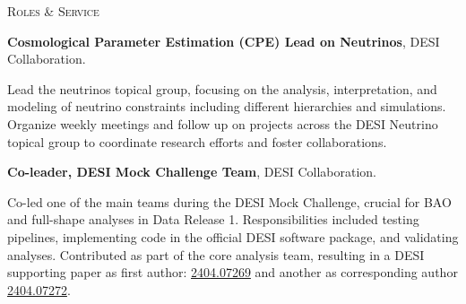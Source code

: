 \begin{rubric}{\faCogs \textsc{Roles \& Service}}

\entry*[2024-2025]%
\textbf{Cosmological Parameter Estimation (CPE) Lead on Neutrinos}, DESI Collaboration. \par
Lead the neutrinos topical group, focusing on the analysis, interpretation, and modeling of neutrino constraints including different hierarchies and simulations. Organize weekly meetings and follow up on projects across the DESI Neutrino topical group to coordinate research efforts and foster collaborations.

\entry*[2023-2024]%
\textbf{Co-leader, DESI Mock Challenge Team}, DESI Collaboration. \par
Co-led one of the main teams during the DESI Mock Challenge, crucial for BAO and full-shape analyses in Data Release 1. Responsibilities included testing pipelines, implementing code in the official DESI software package, and validating analyses. Contributed as part of the core analysis team, resulting in a DESI supporting paper as first author: \href{https://arxiv.org/abs/2404.07269}{2404.07269} and another as corresponding author \href{https://arxiv.org/abs/2404.07272}{2404.07272}.

\end{rubric}